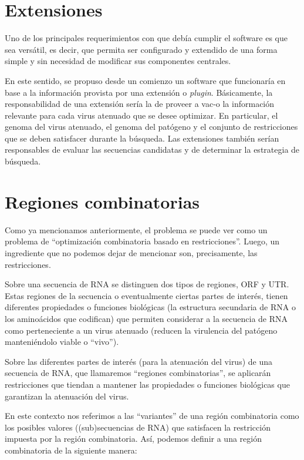 \section{Extensiones}

Uno de los principales requerimientos con que deb\'ia cumplir el software es
que sea vers\'atil, es decir, que permita ser configurado y extendido de una
forma simple y sin necesidad de modificar sus componentes centrales.

En este sentido, se propuso desde un comienzo un software que funcionar\'ia en
base a la informaci\'on provista por una extensi\'on o \textit{plugin}.
B\'asicamente, la responsabilidad de una extensi\'on ser\'ia la de proveer a
\ac{vac-o} la informaci\'on relevante para cada virus atenuado que se desee
optimizar. En particular, el genoma del virus atenuado, el genoma del
pat\'ogeno y el conjunto de restricciones que se deben satisfacer durante la
b\'usqueda. Las extensiones tambi\'en ser\'ian responsables de evaluar las
secuencias candidatas y de determinar la estrategia de b\'usqueda.


\section{Regiones combinatorias}

Como ya mencionamos anteriormente, el problema se puede ver como un problema de
``optimizaci\'on combinatoria basado en restricciones''. Luego, un ingrediente
que no podemos dejar de mencionar son, precisamente, las restricciones. 

Sobre una secuencia de \ac{RNA} se distinguen dos tipos de regiones, \ac{ORF} y
\ac{UTR}. Estas regiones de la secuencia o eventualmente ciertas partes de
inter\'es, tienen diferentes propiedades o funciones biol\'ogicas (la estructura
secundaria de \ac{RNA} o los amino\'acidos que codifican) que permiten
considerar a la secuencia de \ac{RNA} como perteneciente a un virus atenuado
(reducen la virulencia del pat\'ogeno manteni\'endolo viable o ``vivo'').

Sobre las diferentes partes de inter\'es (para la atenuaci\'on del virus)
de una secuencia de \ac{RNA}, que llamaremos ``regiones combinatorias'', se
aplicar\'an restricciones que tiendan a mantener las propiedades o funciones
biol\'ogicas que garantizan la atenuaci\'on del virus. 

En este contexto nos referimos a las ``variantes'' de una regi\'on combinatoria
como los posibles valores ((sub)secuencias de \ac{RNA}) que satisfacen la
restricci\'on impuesta por la regi\'on combinatoria. As\'i, podemos definir a
una regi\'on combinatoria de la siguiente manera:


